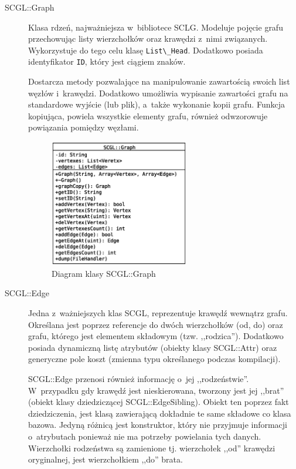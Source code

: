 \documentclass[a4paper,12pt,polish,oneside,openright]{thesis}
\newcommand\code[1]{\lstinline[style=line]{#1}}
\begin{document}
\begin{description}
	\item[SCGL::Graph]
	Klasa rdzeń, najważniejsza w~bibliotece SCLG.
	Modeluje pojęcie grafu przechowując listy wierzchołków oraz krawędzi z~nimi związanych.
	Wykorzystuje do tego celu klasę \code{List\_Head}.
	Dodatkowo posiada identyfikator \code{ID}, który jest ciągiem znaków.

	Dostarcza metody pozwalające na manipulowanie zawartością swoich list węzłów i~krawędzi.
	Dodatkowo umożliwia wypisanie zawartości grafu na standardowe wyjście (lub plik), a~także wykonanie kopii grafu.
	Funkcja kopiująca, powiela wszystkie elementy grafu, również odwzorowuje powiązania pomiędzy węzłami.
	\begin{figure}[htb]
	\begin{center}
		\includegraphics[width=0.60\textwidth]{gfx/class_graph.eps}
		\caption{Diagram klasy SCGL::Graph}
	\end{center}
	\end{figure}

	\item[SCGL::Edge]
	Jedna z~ważniejszych klas SCGL, reprezentuje krawędź wewnątrz grafu.
	Określana jest poprzez referencje do dwóch wierzchołków (od, do) oraz grafu, którego jest elementem składowym (tzw. ,,rodzica'').
	Dodatkowo posiada dynamiczną listę atrybutów (obiekty klasy SCGL::Attr) oraz generyczne pole koszt (zmienna typu określanego podczas kompilacji).

	SCGL::Edge przenosi również informację o~jej ,,rodzeństwie''.
	W~przypadku gdy krawędź jest nieskierowana, tworzony jest jej ,,brat'' (obiekt klasy dziedziczącej SCGL::EdgeSibling).
	Obiekt ten poprzez fakt dziedziczenia, jest klasą zawierającą dokładnie te same składowe co klasa bazowa. Jedyną różnicą jest konstruktor, który nie przyjmuje informacji o~atrybutach ponieważ nie ma potrzeby powielania tych danych.
	Wierzchołki rodzeństwa są zamienione tj. wierzchołek ,,od'' krawędzi oryginalnej, jest wierzchołkiem ,,do'' brata.


\end{description}
\end{document}
